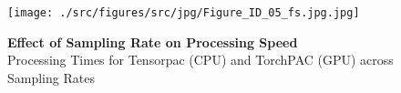         \clearpage
        \begin{figure}[ht]
        	\centering
            \texttt{[image: ./src/figures/src/jpg/Figure\_ID\_05\_fs.jpg.jpg]}

\caption{\textbf{
Effect of Sampling Rate on Processing Speed
}
\smallskip
\\
Processing Times for Tensorpac (CPU) and TorchPAC (GPU) across Sampling Rates
}
        	\label{fig:05_fs}
        \end{figure}
